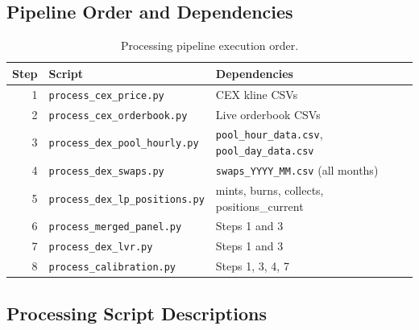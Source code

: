 \documentclass[11pt,a4paper]{article}
\begin{document}
\subsection{Pipeline Order and Dependencies}

\begin{table}[H]
\centering
\small
\begin{tabular}{rll}
\toprule
\textbf{Step} & \textbf{Script} & \textbf{Dependencies} \\
\midrule
1 & \texttt{process\_cex\_price.py}       & CEX kline CSVs \\
2 & \texttt{process\_cex\_orderbook.py}   & Live orderbook CSVs \\
3 & \texttt{process\_dex\_pool\_hourly.py} & \texttt{pool\_hour\_data.csv}, \texttt{pool\_day\_data.csv} \\
4 & \texttt{process\_dex\_swaps.py}       & \texttt{swaps\_YYYY\_MM.csv} (all months) \\
5 & \texttt{process\_dex\_lp\_positions.py} & mints, burns, collects, positions\_current \\
6 & \texttt{process\_merged\_panel.py}    & Steps 1 and 3 \\
7 & \texttt{process\_dex\_lvr.py}         & Steps 1 and 3 \\
8 & \texttt{process\_calibration.py}      & Steps 1, 3, 4, 7 \\
\bottomrule
\end{tabular}
\caption{Processing pipeline execution order.}
\end{table}

\subsection{Processing Script Descriptions}
\end{document}
